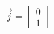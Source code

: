 \documentclass[preview]{standalone}
\begin{document}
\begin{align*}
\vec{j} = \begin{bmatrix} 0 \\ 1 \end{bmatrix}
\end{align*}
\end{document}
